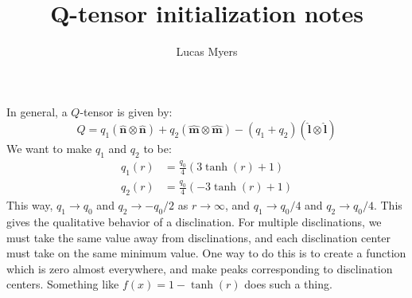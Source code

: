 \documentclass[reqno]{article}
\newcommand{\n}{\hat{\mathbf{n}}}
\newcommand{\m}{\hat{\mathbf{m}}}
\newcommand{\boldl}{\hat{\mathbf{l}}}
\begin{document}
\title{Q-tensor initialization notes}
\author{Lucas Myers}
\maketitle

In general, a $Q$-tensor is given by:
\begin{equation}
    Q 
    = 
    q_1 \left(\n \otimes \n\right)
    + q_2 \left(\m \otimes \m\right)
    - (q_1 + q_2) \left( \boldl \otimes \boldl \right)
\end{equation}
We want to make $q_1$ and $q_2$ to be:
\begin{align}
    q_1(r)
    &=
    \frac{q_0}{4} \left(3 \tanh(r) + 1 \right) \\
    q_2(r)
    &=
    \frac{q_0}{4} \left(-3 \tanh(r) + 1 \right)
\end{align}
This way, $q_1 \to q_0$ and $q_2 \to -q_0 / 2$ as $r \to \infty$, and $q_1 \to q_0 / 4$ and $q_2 \to q_0 / 4$.
This gives the qualitative behavior of a disclination.
For multiple disclinations, we must take the same value away from disclinations, and each disclination center must take on the same minimum value.
One way to do this is to create a function which is zero almost everywhere, and make peaks corresponding to disclination centers.
Something like $f(x) = 1 - \tanh(r)$ does such a thing.

\begin{figure}[!h]
\centering
{}
\end{figure}
\end{document}
